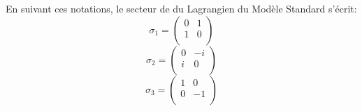 En suivant ces notations, le secteur de  du Lagrangien du Modèle Standard s'écrit:
\marginpar
{
\begin{equation*}
\sigma_{1}=\begin{pmatrix} 
0&1\\
1&0\\
\end{pmatrix}
\end{equation*}
\vspace{0.2cm}
\begin{equation*}
\sigma_{2}=\begin{pmatrix} 
0&-i\\
i&0\\
\end{pmatrix}
\end{equation*}
\vspace{0.2cm}
\begin{equation*}
\sigma_{3}=\begin{pmatrix} 
1&0\\
0&-1\\
\end{pmatrix}
\end{equation*}
\label{Pauli}
}
\marginpar
